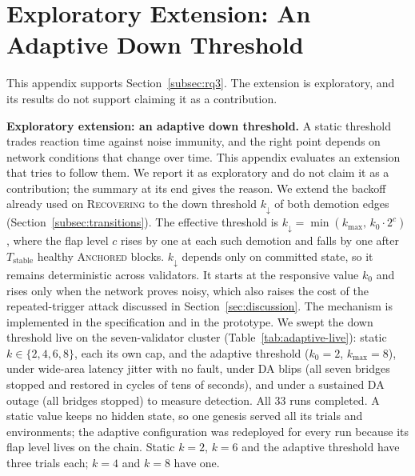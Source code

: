 \section{Exploratory Extension: An Adaptive Down Threshold}
\label{app:adaptive}

This appendix supports Section~\ref{subsec:rq3}. The extension is exploratory, and its results do not support claiming it as a contribution.

\textbf{Exploratory extension: an adaptive down threshold.} A static threshold
trades reaction time against noise immunity, and the right point depends on
network conditions that change over time. This appendix evaluates an
extension that tries to follow them. We report it as exploratory and do not claim
it as a contribution; the summary at its end gives the reason. We extend the backoff already used on
\textsc{Recovering} to the down threshold $k_{\downarrow}$ of both demotion
edges (Section~\ref{subsec:transitions}). The effective threshold is
$k_{\downarrow} = \min(k_{\max},\, k_0 \cdot 2^{c})$, where the flap level $c$
rises by one at each such demotion and falls by one after $T_{\text{stable}}$
healthy \textsc{Anchored} blocks. $k_{\downarrow}$ depends only on committed
state, so it remains deterministic across validators. It starts at the
responsive value $k_0$ and rises only when the network proves noisy, which
also raises the cost of the repeated-trigger attack discussed in
Section~\ref{sec:discussion}. The mechanism is implemented in the
specification and in the prototype.
We swept the down threshold live on the seven-validator cluster
(Table~\ref{tab:adaptive-live}): static $k\in\{2,4,6,8\}$, each its own cap, and
the adaptive threshold ($k_0{=}2$, $k_{\max}{=}8$), under wide-area latency
jitter with no fault, under DA blips (all seven bridges stopped and restored
in cycles of tens of seconds), and under a sustained DA outage (all bridges
stopped) to measure detection. All 33
runs completed. A static value keeps no hidden state, so one genesis served all
its trials and environments; the adaptive configuration was redeployed for every
run because its flap level lives on the chain. Static $k{=}2$, $k{=}6$ and the
adaptive threshold have three trials each; $k{=}4$ and $k{=}8$ have one.

\begin{table}[h]
\caption{Live down-edge sweep on seven validators (300\,s runs, mean $\pm$
95\% Student-$t$ interval over the runs, none for a single run; flaps and uptime
averaged over the seven validators of a trial). ``Uptime'' is the share of the
run in \textsc{Anchored}; ``Detection'' is the delay from stopping the bridges of the sustained outage
to the first non-\textsc{Anchored} state on one validator, and ``To
\textsc{Sovereign}'' the delay to \textsc{Sovereign}.}
\label{tab:adaptive-live}
\centering
\footnotesize
\resizebox{\linewidth}{!}{}
\end{table}

